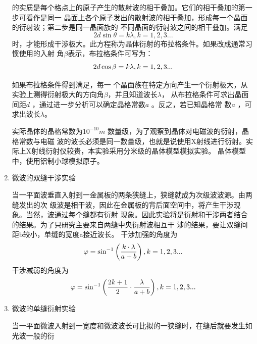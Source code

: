 \documentclass[11pt]{article}
\begin{document}
\begin{enumerate}[itemjoin=\\]
    的实质是每个格点上的原子产生的散射波的相干叠加。它们的相干叠加的第一步可看作是同一
    晶面上各个原子发出的散射波的相干叠加，形成每一个晶面的衍射波；第二步是同一晶面族的
    不同晶面的衍射波之间的相干叠加。满足
    \begin{equation}
        2d\sin \theta =k\lambda,k=1,2,3...
    \end{equation}
    时，才能形成干涉极大。此方程称为晶体衍射的布拉格条件。如果改成通常习惯使用的入射
    角$\beta$表示，布拉格条件可写为：
    \begin{equation}{\label{eqn-2}}
        2d\cos \beta =k\lambda,k=1,2,3...
    \end{equation}
    \par \hspace*{2em}如果布拉格条件得到满足，每一
    个晶面族在特定方向产生一个衍射极大，从实验上测得衍射极大的方向角$\beta$，并且知道波长$\lambda$，
    从布拉格条件可求出晶面间距$d$ ，通过进一步分析可以确定晶格常数$a$ 。反之，若已知晶格常
    数$a$ ，可求出波长$\lambda$。
    \par \hspace*{2em}实际晶体的晶格常数为$10^{-10}m$ 数量级，为了观察到晶体对电磁波的衍射，晶格常数与电磁
    波的波长必须是同一数量级，也就是说使用X射线进行衍射。实际上X射线衍射仪较贵，本实验采用分米级的晶体模型模拟实验。
    晶体模型中，使用铝制小球模拟原子。
    \item 微波的双缝干涉实验
    \par \hspace*{2em} 当一平面波垂直入射到一金属板的两条狭缝上，狭缝就成为次级波波源。由两缝发出的次
    级波是相干波，因此在金属板的背后面空间中，将产生干涉现象。当然，波通过每个缝都有衍射
    现象。因此实验将是衍射和干涉两者结合的结果。为了只研究主要来自两缝中央衍射波相互干
    涉的结果，要让双缝间距b较小，单缝的宽度a接近波长。
    \newline 干涉加强的角度为
    \begin{equation}{\label{eqn-3}}
        \varphi =\sin^{-1}\left(\frac{k\cdot \lambda}{a+b}\right),k=1,2,3...
    \end{equation}
    \newline 干涉减弱的角度为
    \begin{equation}{\label{eqn-4}}
        \varphi =\sin^{-1}\left(\frac{2k+1}{2}\cdot \frac{\lambda}{a+b}\right),k=1,2,3...
    \end{equation}
    \item 微波的单缝衍射实验
    \par \hspace*{2em} 当一平面微波入射到一宽度和微波波长可比拟的一狭缝时，在缝后就要发生如光波一般的衍

\end{enumerate}
\end{document}
